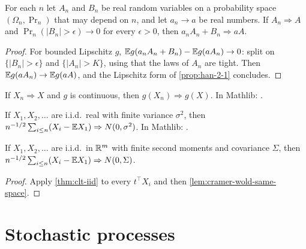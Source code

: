 \begin{lemma}
  \label{lem:slutsky-laws}
  For each $n$ let $A_n$ and $B_n$ be real random variables on a probability space $(\Omega_n,\Pr_n)$ that may depend on $n$, and let $a_n\to a$ be real numbers. If $A_n\Rightarrow A$ and $\Pr_n(|B_n|>\epsilon)\to0$ for every $\epsilon>0$, then $a_nA_n+B_n\Rightarrow aA$.
\end{lemma}
\begin{proof}
  For bounded Lipschitz $g$, $\mathbb{E} g(a_nA_n+B_n)-\mathbb{E} g(aA_n)\to0$: split on $\{|B_n|>\epsilon\}$ and $\{|A_n|>K\}$, using that the laws of $A_n$ are tight. Then $\mathbb{E} g(aA_n)\to\mathbb{E} g(aA)$, and the Lipschitz form of \cref{prop:han-2-1} concludes.
\end{proof}

\begin{theorem}
  \label{thm:han-2-6}
  \mathlibok
  If $X_n\Rightarrow X$ and $g$ is continuous, then $g(X_n)\Rightarrow g(X)$.
  In Mathlib: .
\end{theorem}

\begin{theorem}
  \label{thm:clt-iid}
  \mathlibok
  If $X_1,X_2,\dots$ are i.i.d.\ real with finite variance $\sigma^2$, then $n^{-1/2}\sum_{i\le n}(X_i-\mathbb{E} X_1)\Rightarrow N(0,\sigma^2)$.
  In Mathlib: .
\end{theorem}

\begin{corollary}
  \label{cor:clt-iid-multivariate}
  If $X_1,X_2,\dots$ are i.i.d.\ in $\mathbb{R}^m$ with finite second moments and covariance $\Sigma$, then $n^{-1/2}\sum_{i\le n}(X_i-\mathbb{E} X_1)\Rightarrow N(0,\Sigma)$.
\end{corollary}
\begin{proof}
  Apply \cref{thm:clt-iid} to every $t^\top X_i$ and then \cref{lem:cramer-wold-same-space}.
\end{proof}

\section{Stochastic processes}

